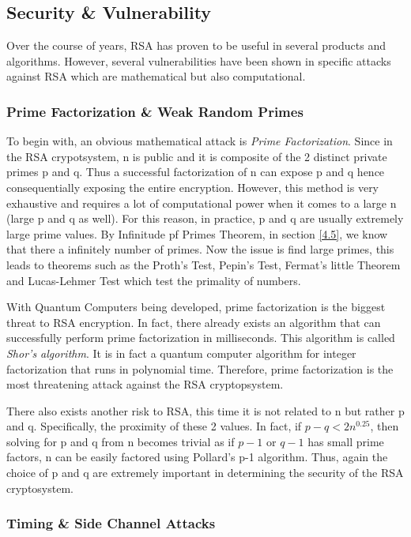 \documentclass{article}
\begin{document}
\subsection{Security \& Vulnerability}

\quad \quad Over the course of years, RSA has proven to be useful in several products and algorithms. However, several vulnerabilities have been shown in specific attacks against RSA which are mathematical but also computational. 

\subsubsection{Prime Factorization \& Weak Random Primes}
\quad \quad To begin with, an obvious mathematical attack is \textit{Prime Factorization}. Since in the RSA crypotsystem, n is public and it is composite of the 2 distinct private primes p and q. Thus a successful factorization of n can expose p and q hence consequentially exposing the entire encryption. However, this method is very exhaustive and requires a lot of computational power when it comes to a large n (large p and q as well). For this reason, in practice, p and q are usually extremely large prime values. By Infinitude pf Primes Theorem, in section \ref{4.5}, we know that there a infinitely number of primes. Now the issue is find large primes, this leads to theorems such as the Proth's Test, Pepin's Test, Fermat's little Theorem and Lucas-Lehmer Test which test the primality of numbers. 

With Quantum Computers being developed, prime factorization is the biggest threat to RSA encryption. In fact, there already exists an algorithm that can successfully perform prime factorization in milliseconds. This algorithm is called \textit{Shor's algorithm}. It is in fact a quantum computer algorithm for integer factorization that runs in polynomial time. Therefore, prime factorization is the most threatening attack against the RSA cryptopsystem.

There also exists another risk to RSA, this time it is not related to n but rather p and q. Specifically, the proximity of these 2 values. In fact, if $p-q < 2n^{0.25}$, then solving for p and q from n becomes trivial as if $p-1$ or $q-1$ has small prime factors, n can be easily factored using Pollard's p-1 algorithm. Thus, again the choice of p and q are extremely important in determining the security of the RSA cryptosystem.

\subsubsection{Timing \& Side Channel Attacks }
\end{document}
